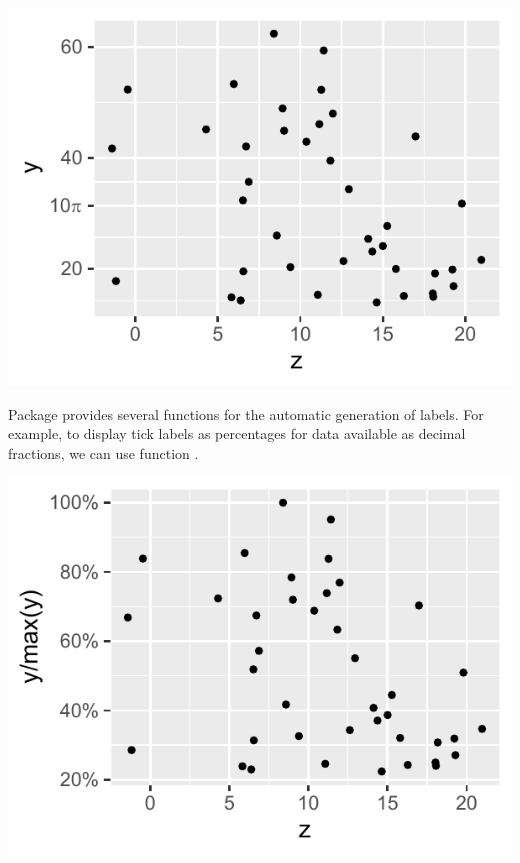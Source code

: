 \documentclass[krantz2]{krantz}\usepackage{knitr}
\begin{document}
\begin{knitrout}\footnotesize
{}\color{fgcolor}\begin{kframe}
\begin{alltt}
  \hlopt{+}
  \hlstd{()} \hlopt{+}
  \hlstd{(} \hlstd{=} \hlstd{(} \hlopt{*} \hlstd{,} \hlstd{,} \hlstd{),}
                      \hlstd{=} \hlstd{(}\hlstd{,} \hlstd{(}\hlopt{*} \hlstd{,} \hlstd{))}
\end{alltt}
\end{kframe}

{\centering \includegraphics[width=.54\textwidth]{figure/pos-scale-ticks-02-1} 

}


\end{knitrout}

Package  provides several functions for the automatic generation of labels. For example, to display tick labels as percentages for data available as decimal fractions, we can use function .

\begin{knitrout}\footnotesize
{}\color{fgcolor}\begin{kframe}
\begin{alltt}
  \hlopt{/}  \hlopt{+}
  \hlstd{()} \hlopt{+}
  \hlstd{(} \hlopt{::}
\end{alltt}
\end{kframe}

{\centering \includegraphics[width=.54\textwidth]{figure/pos-scale-ticks-03-1} 

}


\end{knitrout}
\end{document}

